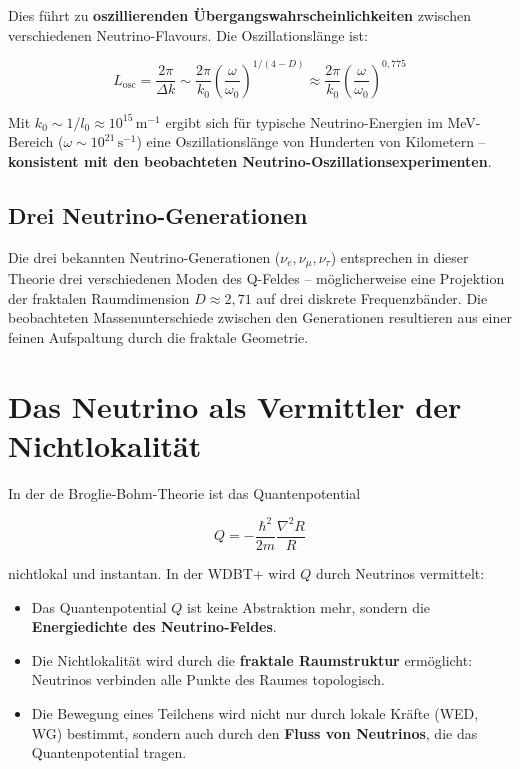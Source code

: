 \documentclass[12pt,a4paper]{article}
\begin{document}
Dies führt zu \textbf{oszillierenden Übergangswahrscheinlichkeiten} zwischen verschiedenen Neutrino-Flavours. Die Oszillationslänge ist:

\[
L_{\text{osc}} = \frac{2\pi}{\Delta k} \sim \frac{2\pi}{k_0} \left( \frac{\omega}{\omega_0} \right)^{1/(4-D)} \approx \frac{2\pi}{k_0} \left( \frac{\omega}{\omega_0} \right)^{0,775}
\]

Mit \(k_0 \sim 1/l_0 \approx 10^{15} \, \text{m}^{-1}\) ergibt sich für typische Neutrino-Energien im MeV-Bereich (\(\omega \sim 10^{21} \, \text{s}^{-1}\)) eine Oszillationslänge von Hunderten von Kilometern – \textbf{konsistent mit den beobachteten Neutrino-Oszillationsexperimenten}.

\subsection{Drei Neutrino-Generationen}

Die drei bekannten Neutrino-Generationen (\(\nu_e, \nu_\mu, \nu_\tau\)) entsprechen in dieser Theorie drei verschiedenen Moden des Q-Feldes – möglicherweise eine Projektion der fraktalen Raumdimension \(D \approx 2,71\) auf drei diskrete Frequenzbänder. Die beobachteten Massenunterschiede zwischen den Generationen resultieren aus einer feinen Aufspaltung durch die fraktale Geometrie.

\section{Das Neutrino als Vermittler der Nichtlokalität}

In der de Broglie-Bohm-Theorie ist das Quantenpotential

\[
Q = -\frac{\hbar^2}{2m} \frac{\nabla^2 R}{R}
\]

nichtlokal und instantan. In der WDBT+ wird \(Q\) durch Neutrinos vermittelt:

\begin{itemize}
    \item Das Quantenpotential \(Q\) ist keine Abstraktion mehr, sondern die \textbf{Energiedichte des Neutrino-Feldes}.
    \item Die Nichtlokalität wird durch die \textbf{fraktale Raumstruktur} ermöglicht: Neutrinos verbinden alle Punkte des Raumes topologisch.
    \item Die Bewegung eines Teilchens wird nicht nur durch lokale Kräfte (WED, WG) bestimmt, sondern auch durch den \textbf{Fluss von Neutrinos}, die das Quantenpotential tragen.
\end{itemize}
\end{document}
